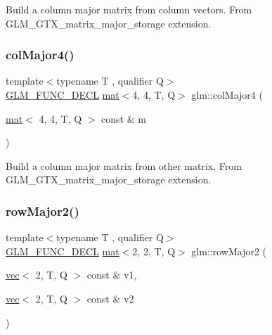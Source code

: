 Build a column major matrix from column vectors. From G\+L\+M\+\_\+\+G\+T\+X\+\_\+matrix\+\_\+major\+\_\+storage extension. \mbox{\label{group__gtx__matrix__major__storage_gaf3f9511c366c20ba2e4a64c9e4cec2b3}} 
\subsubsection{\texorpdfstring{col\+Major4()}{colMajor4()}\hspace{0.1cm}{\footnotesize\ttfamily [2/2]}}
{\footnotesize\ttfamily template$<$typename T , qualifier Q$>$ \\
\mbox{\hyperlink{setup_8hpp_ab2d052de21a70539923e9bcbf6e83a51}{G\+L\+M\+\_\+\+F\+U\+N\+C\+\_\+\+D\+E\+CL}} \mbox{\hyperlink{structglm_1_1mat}{mat}}$<$4, 4, T, Q$>$ glm\+::col\+Major4 (\begin{DoxyParamCaption}\item[{\mbox{\hyperlink{structglm_1_1mat}{mat}}$<$ 4, 4, T, Q $>$ const \&}]{m }\end{DoxyParamCaption})}

Build a column major matrix from other matrix. From G\+L\+M\+\_\+\+G\+T\+X\+\_\+matrix\+\_\+major\+\_\+storage extension. \mbox{\label{group__gtx__matrix__major__storage_gaf5b1aee9e3eb1acf9d6c3c8be1e73bb8}} 
\subsubsection{\texorpdfstring{row\+Major2()}{rowMajor2()}\hspace{0.1cm}{\footnotesize\ttfamily [1/2]}}
{\footnotesize\ttfamily template$<$typename T , qualifier Q$>$ \\
\mbox{\hyperlink{setup_8hpp_ab2d052de21a70539923e9bcbf6e83a51}{G\+L\+M\+\_\+\+F\+U\+N\+C\+\_\+\+D\+E\+CL}} \mbox{\hyperlink{structglm_1_1mat}{mat}}$<$2, 2, T, Q$>$ glm\+::row\+Major2 (\begin{DoxyParamCaption}\item[{\mbox{\hyperlink{structglm_1_1vec}{vec}}$<$ 2, T, Q $>$ const \&}]{v1,  }\item[{\mbox{\hyperlink{structglm_1_1vec}{vec}}$<$ 2, T, Q $>$ const \&}]{v2 }\end{DoxyParamCaption})}

